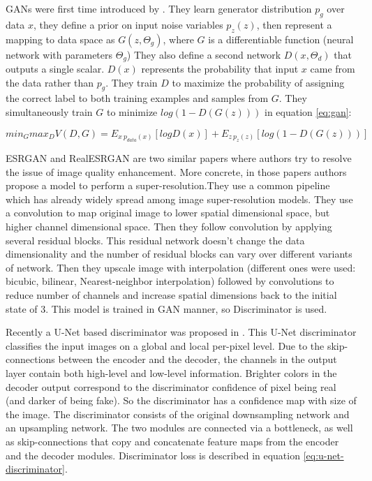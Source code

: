 GANs were first time introduced by \cite{Goodfellow_Pouget-Abadie_Mirza_Xu_Warde-Farley_Ozair_Courville_Bengio_2014}. They learn generator distribution $p_g$ over data $x$, they define a prior on input noise variables $p_z(z)$, then represent a mapping to data space as $G(z, \Theta_g)$, where $G$ is a differentiable function (neural network with parameters $\Theta_g$) They also define a second network $D(x, \Theta_d)$ that outputs a single scalar. $D(x)$ represents the probability that input $x$ came from the data rather than $p_g$. They train $D$ to maximize the probability of assigning the correct label to both training examples and samples from $G$. They simultaneously train $G$ to minimize $log(1 − D(G(z)))$ in equation \ref{eq:gan}:

\begin{equation}
    \label{eq:gan}
    min_G max_D V(D, G) = E_{x~p_{data}(x)} [log D(x)] + E_{z~p_z(z)} [log(1 - D(G(z)))]
\end{equation}

ESRGAN \cite{Wang_Yu_Wu_Gu_Liu_Dong_Qiao_Loy_2019} and RealESRGAN \cite{Wang_Xie_Dong_Shan_2021} are two similar papers where authors try to resolve the issue of image quality enhancement. More concrete, in those papers authors propose a model to perform a super-resolution.They use a common pipeline which has already widely spread among image super-resolution models. They use a convolution to map original image to lower spatial dimensional space, but higher channel dimensional space. Then they follow convolution by applying several residual blocks. This residual network doesn't change the data dimensionality and the number of residual blocks can vary over different variants of network. Then they upscale image with interpolation (different ones were used: bicubic, bilinear, Nearest-neighbor interpolation) followed by convolutions to reduce number of channels and increase spatial dimensions back to the initial state of 3. This model is trained in GAN manner, so Discriminator is used.

Recently a U-Net based discriminator was proposed in \cite{schonfeld_u-net_2021}. This U-Net discriminator classifies the input images on a global and local per-pixel level. Due to the skip-connections between the encoder and the decoder, the channels in the output layer contain both high-level and low-level information. Brighter colors in the decoder output correspond to the discriminator confidence of pixel being real (and darker of being fake). So the discriminator has a confidence map with size of the image. The discriminator consists of the original downsampling network and an upsampling network. The two modules are connected via a bottleneck, as well as skip-connections that copy and concatenate feature maps from the encoder and the decoder modules. Discriminator loss is described in equation \ref{eq:u-net-discriminator}.

